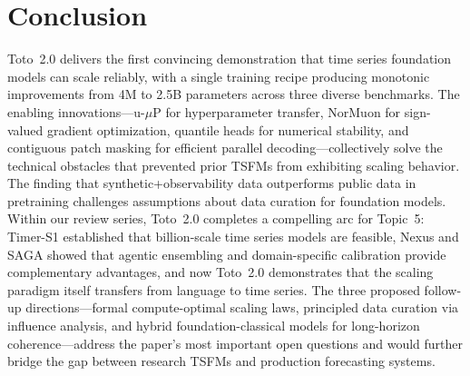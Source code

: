 \documentclass[11pt,a4paper]{article}
\begin{document}
\section*{Conclusion}

Toto~2.0 delivers the first convincing demonstration that time series foundation models can scale reliably, with a single training recipe producing monotonic improvements from 4M to 2.5B parameters across three diverse benchmarks. The enabling innovations---u-$\mu$P for hyperparameter transfer, NorMuon for sign-valued gradient optimization, quantile heads for numerical stability, and contiguous patch masking for efficient parallel decoding---collectively solve the technical obstacles that prevented prior TSFMs from exhibiting scaling behavior. The finding that synthetic+observability data outperforms public data in pretraining challenges assumptions about data curation for foundation models. Within our review series, Toto~2.0 completes a compelling arc for Topic~5: Timer-S1 established that billion-scale time series models are feasible, Nexus and SAGA showed that agentic ensembling and domain-specific calibration provide complementary advantages, and now Toto~2.0 demonstrates that the scaling paradigm itself transfers from language to time series. The three proposed follow-up directions---formal compute-optimal scaling laws, principled data curation via influence analysis, and hybrid foundation-classical models for long-horizon coherence---address the paper's most important open questions and would further bridge the gap between research TSFMs and production forecasting systems.
\end{document}
